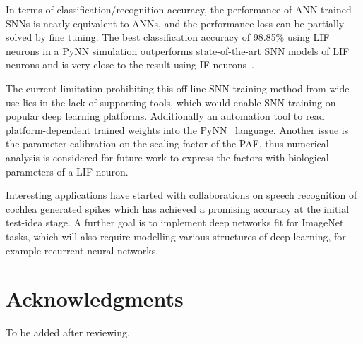 \documentclass{article}
\begin{document}
In terms of classification/recognition accuracy, the performance of ANN-trained SNNs is nearly equivalent to ANNs, and the performance loss can be partially solved by fine tuning.
The best classification accuracy of 98.85\% using LIF neurons in a PyNN simulation outperforms state-of-the-art SNN models of LIF neurons and is very close to the result using IF neurons~\cite{diehl2015fast}.

The current limitation prohibiting this off-line SNN training method from wide use lies in the lack of supporting tools, which would enable SNN training on popular deep learning platforms. Additionally an automation tool to read platform-dependent trained weights into the PyNN~\cite{davison2008pynn} language.
Another issue is the parameter calibration on the scaling factor of the PAF, thus numerical analysis is considered for future work to express the factors with biological parameters of a LIF neuron.

Interesting applications have started with collaborations on speech recognition of cochlea generated spikes which has achieved a promising accuracy at the initial test-idea stage.
A further goal is to implement deep networks fit for ImageNet~\cite{deng2009imagenet} tasks, which will also require modelling various structures of deep learning, for example recurrent neural networks.

\section*{Acknowledgments}
To be added after reviewing.
\end{document}
